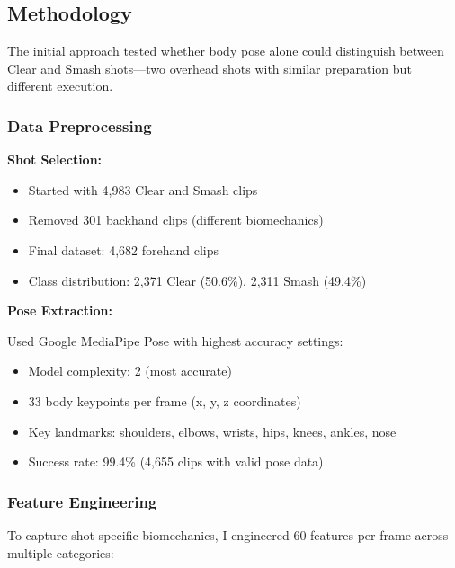 \documentclass[12pt,a4paper]{article}
\begin{document}
\subsection{Methodology}

The initial approach tested whether body pose alone could distinguish between Clear and Smash shots---two overhead shots with similar preparation but different execution.

\subsubsection{Data Preprocessing}

\textbf{Shot Selection:}
\begin{itemize}
\item Started with 4,983 Clear and Smash clips
\item Removed 301 backhand clips (different biomechanics)
\item Final dataset: 4,682 forehand clips
\item Class distribution: 2,371 Clear (50.6\%), 2,311 Smash (49.4\%)
\end{itemize}

\textbf{Pose Extraction:}

Used Google MediaPipe Pose \cite{MediaPipe} with highest accuracy settings:
\begin{itemize}
\item Model complexity: 2 (most accurate)
\item 33 body keypoints per frame (x, y, z coordinates)
\item Key landmarks: shoulders, elbows, wrists, hips, knees, ankles, nose
\item Success rate: 99.4\% (4,655 clips with valid pose data)
\end{itemize}

\subsubsection{Feature Engineering}

To capture shot-specific biomechanics, I engineered 60 features per frame across multiple categories:
\end{document}
